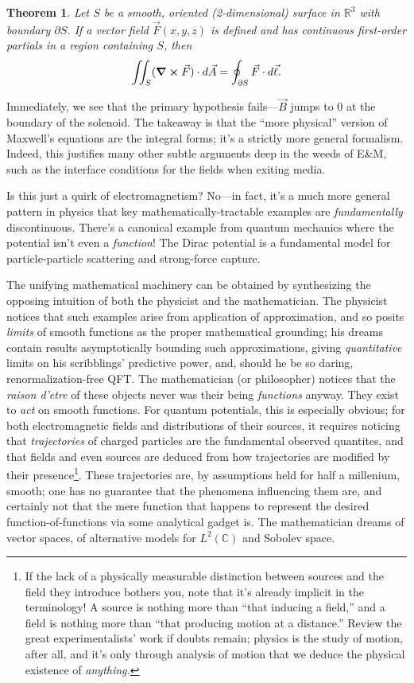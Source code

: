 \documentclass{article}
\newtheorem{thm}{Theorem}
\begin{document}
\begin{thm}
  Let $S$ be a smooth, oriented (2-dimensional) surface in $\mathbb{R}^{3}$ with boundary $\partial S$.
  If a vector field $\vec{F}(x, y, z)$ is defined and has continuous first-order partials in a region containing $S$, then
  \[
    \iint_{S}(\curl{\vec{F}}) \cdot d\vec{A} = \oint_{\partial S}\vec{F} \cdot d\vec{\ell}.
  \]
\end{thm}

Immediately, we see that the primary hypothesis fails---$\vec{B}$ jumps to 0 at the boundary of the solenoid.
The takeaway is that the ``more physical'' version of Maxwell's equations are the integral forms; it's a strictly more general formalism.
Indeed, this justifies many other subtle arguments deep in the weeds of E\&M, such as the interface conditions for the fields when exiting media.

Is this just a quirk of electromagnetism?
No---in fact, it's a much more general pattern in physics that key mathematically-tractable examples are \textit{fundamentally} discontinuous.
There's a canonical example from quantum mechanics where the potential isn't even a \textit{function}!
The Dirac potential is a fundamental model for particle-particle scattering and strong-force capture.

The unifying mathematical machinery can be obtained by synthesizing the opposing intuition of both the physicist and the mathematician.
The physicist notices that such examples arise from application of approximation, and so posits \textit{limits} of smooth functions
as the proper mathematical grounding; his dreams contain results asymptotically bounding such approximations,
giving \textit{quantitative} limits on his scribblings' predictive power, and, should he be so daring, renormalization-free QFT.
The mathematician (or philosopher) notices that the \textit{raison d'etre} of these objects never was their being \textit{functions} anyway.
They exist to \textit{act} on smooth functions.
For quantum potentials, this is especially obvious; for both electromagnetic fields and distributions of their sources,
it requires noticing that \textit{trajectories} of charged particles are the fundamental observed quantites,
and that fields and even sources are deduced from how trajectories are modified by their presence\footnote
{
  If the lack of a physically measurable distinction between sources and the field they introduce bothers you,
  note that it's already implicit in the terminology!
  A source is nothing more than ``that inducing a field,'' and a field is nothing more than ``that producing motion at a distance.''
  Review the great experimentalists' work if doubts remain; physics is the study of motion, after all,
  and it's only through analysis of motion that we deduce the physical existence of \textit{anything.}
}.
These trajectories are, by assumptions held for half a millenium, smooth; one has no guarantee that the phenomena influencing them are,
and certainly not that the mere function that happens to represent the desired function-of-functions via some analytical gadget is.
The mathematician dreams of vector spaces, of alternative models for $L^{2}(\mathbb{C})$ and Sobolev space.
\end{document}
